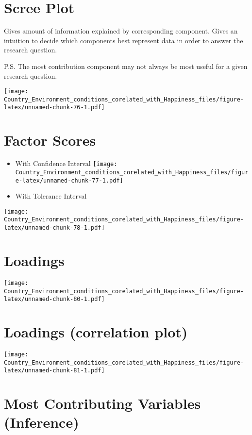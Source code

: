 \documentclass[]{book}
\begin{document}
\hypertarget{scree-plot-4}{%
\section{Scree Plot}\label{scree-plot-4}}

Gives amount of information explained by corresponding component. Gives
an intuition to decide which components best represent data in order to
answer the research question.

P.S. The most contribution component may not always be most useful for a
given research question.

\texttt{[image: Country\_Environment\_conditions\_corelated\_with\_Happiness\_files/figure-latex/unnamed-chunk-76-1.pdf]}

\hypertarget{factor-scores-3}{%
\section{Factor Scores}\label{factor-scores-3}}

\begin{itemize}
\item
  With Confidence Interval
  \texttt{[image: Country\_Environment\_conditions\_corelated\_with\_Happiness\_files/figure-latex/unnamed-chunk-77-1.pdf]}
\item
  With Tolerance Interval
\end{itemize}

\texttt{[image: Country\_Environment\_conditions\_corelated\_with\_Happiness\_files/figure-latex/unnamed-chunk-78-1.pdf]}

\hypertarget{loadings-3}{%
\section{Loadings}\label{loadings-3}}

\texttt{[image: Country\_Environment\_conditions\_corelated\_with\_Happiness\_files/figure-latex/unnamed-chunk-80-1.pdf]}

\hypertarget{loadings-correlation-plot-1}{%
\section{Loadings (correlation
plot)}\label{loadings-correlation-plot-1}}

\texttt{[image: Country\_Environment\_conditions\_corelated\_with\_Happiness\_files/figure-latex/unnamed-chunk-81-1.pdf]}

\hypertarget{most-contributing-variables-inference-1}{%
\section{Most Contributing Variables
(Inference)}\label{most-contributing-variables-inference-1}}
\end{document}
